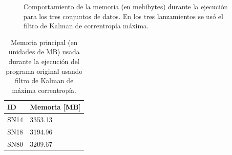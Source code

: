 \begin{figure}[h!]
\centering
{}\hfill
{}\vfill
{}
\caption{Comportamiento de la memoria (en mebibytes) durante la ejecuci\'on para los tres conjuntos de datos. En los tres lanzamientos se us\'o el filtro de Kalman de correntrop\'ia m\'axima.}
\label{fig:mem_mcc}
\end{figure}

\begin{table}[h!]
\centering
\begin{tabular}{|l|l|}
\hline
\textbf{ID} & Memoria [MB]\\\hline\hline
SN14 & 3353.13\\\hline
SN18 & 3194.96\\\hline
SN80 & 3209.67\\\hline
\end{tabular}
\caption{Memoria principal (en unidades de MB) usada durante la ejecuci\'on del programa original usando filtro de Kalman de m\'axima correntrop\'ia.}
\label{tab:mem2}
\end{table}

